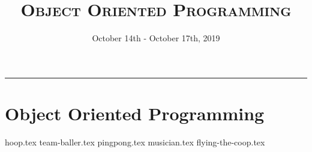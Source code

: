 \documentclass{exam}
\title{\textsc{Object Oriented Programming}}
\date{October 14th - October 17th, 2019}
\begin{document}
\maketitle
\rule{\textwidth}{0.15em}
\fontsize{12}{15}\selectfont

\section{Object Oriented Programming}
\begin{questions}
{hoop.tex}
{team-baller.tex}
{pingpong.tex}
{musician.tex}
{flying-the-coop.tex}
\end{questions}
\end{document}
